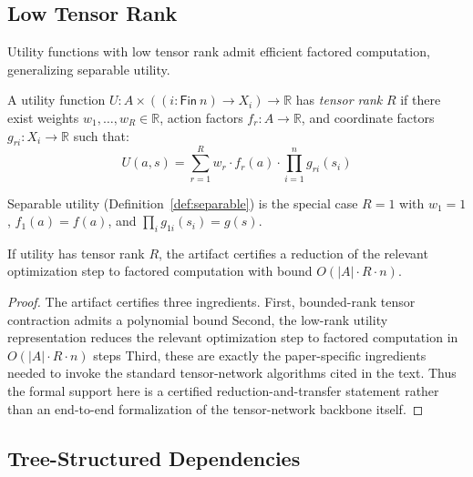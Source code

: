 \subsection{Low Tensor Rank}\label{sec:tract-tensor}

Utility functions with low tensor rank admit efficient factored computation, generalizing separable utility.

\begin{definition}\label{def:tensor-rank}
A utility function $U : A \times ((i : \mathsf{Fin}\ n) \to X_i) \to \mathbb{R}$ has \emph{tensor rank} $R$ if there exist weights $w_1, \ldots, w_R \in \mathbb{R}$, action factors $f_r : A \to \mathbb{R}$, and coordinate factors $g_{ri} : X_i \to \mathbb{R}$ such that:
\[
U(a, s) = \sum_{r=1}^R w_r \cdot f_r(a) \cdot \prod_{i=1}^n g_{ri}(s_i)
\]
\end{definition}

\begin{remark}
Separable utility (Definition~\ref{def:separable}) is the special case $R = 1$ with $w_1 = 1$, $f_1(a) = f(a)$, and $\prod_i g_{1i}(s_i) = g(s)$.
\end{remark}

\begin{theorem}\label{thm:tensor-rank}
If utility has tensor rank $R$, the artifact certifies a reduction of the relevant optimization step to factored computation with bound $O(|A| \cdot R \cdot n)$.
\end{theorem}


\begin{proof}
The artifact certifies three ingredients. First, bounded-rank tensor contraction admits a polynomial bound  Second, the low-rank utility representation reduces the relevant optimization step to factored computation in $O(|A| \cdot R \cdot n)$ steps  Third, these are exactly the paper-specific ingredients needed to invoke the standard tensor-network algorithms cited in the text. Thus the formal support here is a certified reduction-and-transfer statement rather than an end-to-end formalization of the tensor-network backbone itself.
\end{proof}

\subsection{Tree-Structured Dependencies}\label{sec:tract-tree}

